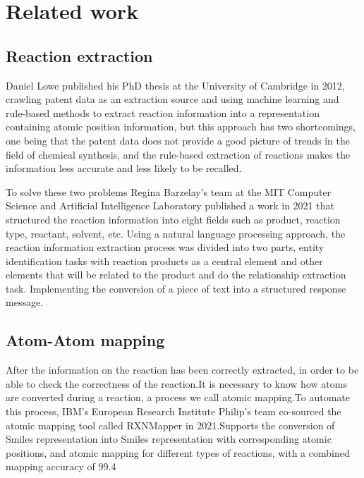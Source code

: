 \documentclass[%
 aip,
 jmp,%
 amsmath,amssymb,
 reprint,%
]{revtex4-2}
\begin{document}

\section{Related work}

\subsection{Reaction extraction}
Daniel Lowe published his PhD thesis at the University of Cambridge in 2012, crawling patent data as an extraction source and using 
machine learning and rule-based methods to extract reaction information into a representation containing atomic position information, 
but this approach has two shortcomings, one being that the patent data does not provide a good picture of trends in the field of chemical 
synthesis, and the rule-based extraction of reactions makes the information less accurate and less likely to be recalled.

To solve these two problems Regina Barzelay's team at the MIT Computer Science and Artificial Intelligence Laboratory published a work 
in 2021 that structured the reaction information into eight fields such as product, reaction type, reactant, solvent, etc. Using a 
natural language processing approach, the reaction information extraction process was divided into two parts, entity identification tasks
with reaction products as a central element and other elements that will be related to the product and do the relationship extraction task.
Implementing the conversion of a piece of text into a structured response message.


\subsection{Atom-Atom mapping}
After the information on the reaction has been correctly extracted, in order to be able to check the correctness of the reaction.It is necessary
to know how atoms are converted during a reaction, a process we call atomic mapping.To automate this process, IBM's European Research Institute 
Philip's team co-sourced the atomic mapping tool called RXNMapper in 2021.Supports the conversion of Smiles representation into Smiles 
representation with corresponding atomic positions, and atomic mapping for different types of reactions, with a combined mapping accuracy 
of 99.4%
\end{document}
